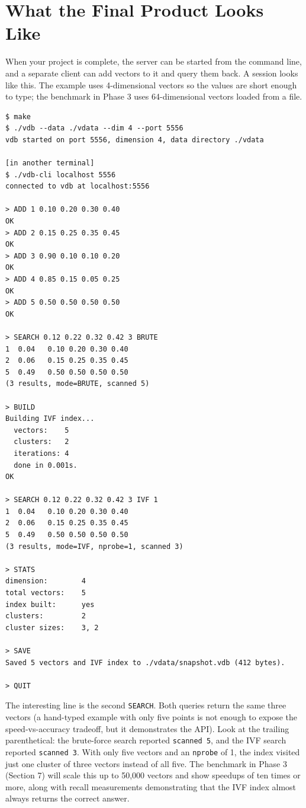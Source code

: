 \documentclass[11pt,a4paper]{article}
\begin{document}
\section{What the Final Product Looks Like}

When your project is complete, the server can be started from the command line, and a separate client can add vectors to it and query them back. A session looks like this. The example uses 4-dimensional vectors so the values are short enough to type; the benchmark in Phase 3 uses 64-dimensional vectors loaded from a file.

\begin{codebox}
\begin{lstlisting}
$ make
$ ./vdb --data ./vdata --dim 4 --port 5556
vdb started on port 5556, dimension 4, data directory ./vdata

[in another terminal]
$ ./vdb-cli localhost 5556
connected to vdb at localhost:5556

> ADD 1 0.10 0.20 0.30 0.40
OK
> ADD 2 0.15 0.25 0.35 0.45
OK
> ADD 3 0.90 0.10 0.10 0.20
OK
> ADD 4 0.85 0.15 0.05 0.25
OK
> ADD 5 0.50 0.50 0.50 0.50
OK

> SEARCH 0.12 0.22 0.32 0.42 3 BRUTE
1  0.04   0.10 0.20 0.30 0.40
2  0.06   0.15 0.25 0.35 0.45
5  0.49   0.50 0.50 0.50 0.50
(3 results, mode=BRUTE, scanned 5)

> BUILD
Building IVF index...
  vectors:    5
  clusters:   2
  iterations: 4
  done in 0.001s.
OK

> SEARCH 0.12 0.22 0.32 0.42 3 IVF 1
1  0.04   0.10 0.20 0.30 0.40
2  0.06   0.15 0.25 0.35 0.45
5  0.49   0.50 0.50 0.50 0.50
(3 results, mode=IVF, nprobe=1, scanned 3)

> STATS
dimension:        4
total vectors:    5
index built:      yes
clusters:         2
cluster sizes:    3, 2

> SAVE
Saved 5 vectors and IVF index to ./vdata/snapshot.vdb (412 bytes).

> QUIT
\end{lstlisting}
\end{codebox}

The interesting line is the second \texttt{SEARCH}. Both queries return the same three vectors (a hand-typed example with only five points is not enough to expose the speed-vs-accuracy tradeoff, but it demonstrates the API). Look at the trailing parenthetical: the brute-force search reported \texttt{scanned 5}, and the IVF search reported \texttt{scanned 3}. With only five vectors and an \texttt{nprobe} of 1, the index visited just one cluster of three vectors instead of all five. The benchmark in Phase 3 (Section 7) will scale this up to 50{,}000 vectors and show speedups of ten times or more, along with recall measurements demonstrating that the IVF index almost always returns the correct answer.
\end{document}
